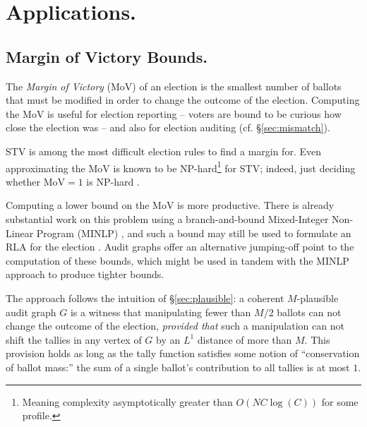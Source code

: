 \newcommand{\pG}{\partial G}

\section{Applications.}
\subsection{Margin of Victory Bounds.}
The \emph{Margin of Victory} (MoV) of an election is the smallest number of ballots that must be modified in order to change the outcome of the election. 
Computing the MoV is useful for election reporting -- voters are bound to be curious how close the election was -- and also for election auditing (cf. \S\ref{sec:mismatch}).

STV is among the most difficult election rules to find a margin for. 
Even approximating the MoV is known to be NP-hard\footnote{Meaning complexity asymptotically greater than $O(N C \log(C))$ for some profile.} for STV; indeed, just deciding whether MoV$=1$ is NP-hard \cite{xiaComputingMarginVictory2012}.%

Computing a lower bound on the MoV is more productive. 
There is already substantial work on this problem using a branch-and-bound Mixed-Integer Non-Linear Program (MINLP) \cite{blomAdvancesSTVMargin2026}, and such a bound may still be used to formulate an RLA for the election \cite{ekDoingMoreLess2026}.
Audit graphs offer an alternative jumping-off point to the computation of these bounds, which might be used in tandem with the MINLP approach to produce tighter bounds.

The approach follows the intuition of \S\ref{sec:plausible}: a coherent $M$-plausible audit graph $G$ is a witness that manipulating fewer than $M/2$ ballots can not change the outcome of the election, \emph{provided that} such a manipulation can not shift the tallies in any vertex of $G$ by an $L^1$ distance of more than $M$.
This provision holds as long as the tally function satisfies some notion of ``conservation of ballot mass:'' the sum of a single ballot's contribution to all tallies is at most $1$.

